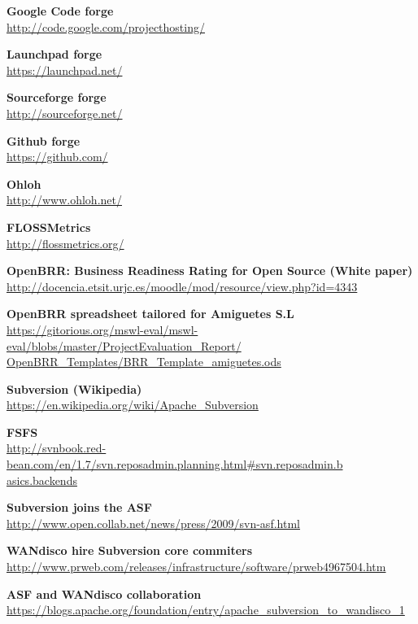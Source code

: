 \documentclass[a4paper,10pt]{article}
\begin{document}
\begin{thebibliography}{25}
\textbf{Google Code forge}\\
{\footnotesize\url{http://code.google.com/projecthosting/}}

\textbf{Launchpad forge}\\
{\footnotesize\url{https://launchpad.net/}}

\textbf{Sourceforge forge}\\
{\footnotesize\url{http://sourceforge.net/}}

\textbf{Github forge}\\
{\footnotesize\url{https://github.com/}}

\textbf{Ohloh}\\
{\footnotesize\url{http://www.ohloh.net/}}

\textbf{FLOSSMetrics}\\
{\footnotesize\url{http://flossmetrics.org/}}

\textbf{OpenBRR: Business Readiness Rating for
Open Source (White paper)}\\
{\footnotesize\url{
http://docencia.etsit.urjc.es/moodle/mod/resource/view.php?id=4343}}

\textbf{OpenBRR spreadsheet tailored for Amiguetes
S.L}\\
{\footnotesize\url{
https://gitorious.org/mswl-eval/mswl-eval/blobs/master/ProjectEvaluation_Report/
OpenBRR_Templates/BRR_Template_amiguetes.ods}}


\textbf{Subversion (Wikipedia)}\\
{\footnotesize\url{https://en.wikipedia.org/wiki/Apache_Subversion}}

\textbf{FSFS}\\
{\footnotesize\url{
http://svnbook.red-bean.com/en/1.7/svn.reposadmin.planning.html#svn.reposadmin.b
asics.backends
}}

\textbf{Subversion joins the ASF}\\
{\footnotesize\url{http://www.open.collab.net/news/press/2009/svn-asf.html}}

\textbf{WANdisco hire Subversion core commiters}\\
{\footnotesize\url{
http://www.prweb.com/releases/infrastructure/software/prweb4967504.htm}}

\textbf{ASF and WANdisco collaboration}\\
{\footnotesize\url{
https://blogs.apache.org/foundation/entry/apache\_subversion\_to\_wandisco_1}}


\end{thebibliography}
\end{document}
